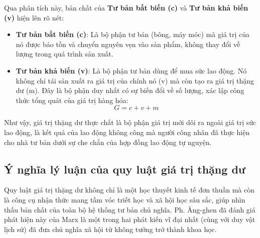 Qua phân tích này, bản chất của \textbf{Tư bản bất biến (c)} và \textbf{Tư bản khả biến (v)} hiện lên rõ nét:
\begin{itemize}
    \item \textbf{Tư bản bất biến (c)}: Là bộ phận tư bản (bông, máy móc) mà giá trị của nó được bảo tồn và chuyển nguyên vẹn vào sản phẩm, không thay đổi về lượng trong quá trình sản xuất.
    \item \textbf{Tư bản khả biến (v)}: Là bộ phận tư bản dùng để mua sức lao động. Nó không chỉ tái sản xuất ra giá trị của chính nó (v) mà còn tạo ra giá trị thặng dư (m). Đây là bộ phận duy nhất có sự biến đổi về số lượng, xác lập công thức tổng quát của giá trị hàng hóa:
    \[
        G = c + v + m
    \]
\end{itemize}
Như vậy, giá trị thặng dư thực chất là bộ phận giá trị mới dôi ra ngoài giá trị sức lao động, là kết quả của lao động không công mà người công nhân đã thực hiện cho nhà tư bản dưới sự che chắn của hợp đồng lao động tự nguyện.

\subsection{Ý nghĩa lý luận của quy luật giá trị thặng dư}
Quy luật giá trị thặng dư không chỉ là một học thuyết kinh tế đơn thuần mà còn là công cụ nhận thức mang tầm vóc triết học và xã hội học sâu sắc, giúp nhìn thấu bản chất của toàn bộ hệ thống tư bản chủ nghĩa. Ph. Ăng-ghen đã đánh giá phát hiện này của Marx là một trong hai phát kiến vĩ đại nhất (cùng với duy vật lịch sử) đã đưa chủ nghĩa xã hội từ không tưởng trở thành khoa học.

